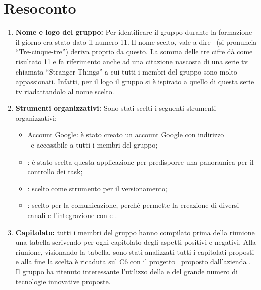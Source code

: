 \documentclass[VER-2017-12-08.tex]{subfiles}
\begin{document}
\chapter{Resoconto}
\begin{enumerate}
	\item \textbf{Nome e logo del gruppo:} Per identificare il gruppo durante la formazione il giorno  era stato dato il numero 11. Il nome scelto, vale a dire \gruppo\ (si pronuncia ``Tre-cinque-tre'') deriva proprio da questo. La somma delle tre cifre dà come risultato 11 e fa riferimento anche ad una citazione nascosta di una serie tv chiamata ``Stranger Things'' a cui tutti i membri del gruppo sono molto appassionati. Infatti, per il logo il gruppo si è ispirato a quello di questa serie tv riadattandolo al nome scelto.
	\item \textbf{Strumenti organizzativi:} Sono stati scelti i seguenti strumenti organizzativi:
	\begin{itemize}
		\item Account Google: è stato creato un account Google con indirizzo\\ \mailleaf\ e accessibile a tutti i membri del gruppo;
		\item {}: è stato scelta questa applicazione per predisporre una panoramica per il controllo dei task;
		\item {}: scelto come strumento per il versionamento;
		\item {}: scelto per la comunicazione, perché permette la creazione di diversi canali e l'integrazione con  e .
	\end{itemize}
	\item \textbf{Capitolato:} tutti i membri del gruppo hanno compilato prima della riunione una tabella scrivendo per ogni capitolato degli aspetti positivi e negativi. Alla riunione, visionando la tabella, sono stati analizzati tutti i capitolati proposti e alla fine la scelta è ricaduta sul C6 con il progetto \progetto\ proposto dall'azienda \Proponente. Il gruppo ha ritenuto interessante l'utilizzo della   e del grande numero di tecnologie innovative proposte. 
\end{enumerate} 
\end{document}

